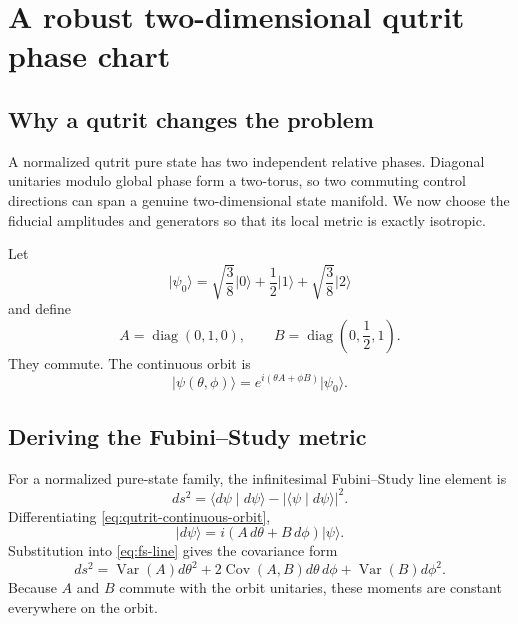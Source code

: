 \documentclass[11pt]{article}
\theoremstyle{definition}
\theoremstyle{remark}
\newcommand{\diag}{\operatorname{diag}}
\newcommand{\ket}[1]{\lvert #1\rangle}
\newcommand{\braket}[2]{\langle #1\mid #2\rangle}
\begin{document}
\section{A robust two-dimensional qutrit phase chart}
\label{sec:qutrit}

\subsection{Why a qutrit changes the problem}

A normalized qutrit pure state has two independent relative phases. Diagonal
unitaries modulo global phase form a two-torus, so two commuting control
directions can span a genuine two-dimensional state manifold. We now choose
the fiducial amplitudes and generators so that its local metric is exactly
isotropic.

Let
\begin{equation}
 \ket{\psi_0}
 =\sqrt{\frac38}\ket0+\frac12\ket1+\sqrt{\frac38}\ket2
 \label{eq:qutrit-fiducial}
\end{equation}
and define
\begin{equation}
 A=\diag(0,1,0),\qquad
 B=\diag\left(0,\frac12,1\right).
 \label{eq:qutrit-generators}
\end{equation}
They commute. The continuous orbit is
\begin{equation}
 \ket{\psi(\theta,\phi)}
 =e^{i(\theta A+\phi B)}\ket{\psi_0}.
 \label{eq:qutrit-continuous-orbit}
\end{equation}

\subsection{Deriving the Fubini--Study metric}

For a normalized pure-state family, the infinitesimal Fubini--Study line
element is
\begin{equation}
 ds^2=\braket{d\psi}{d\psi}
 -|\braket{\psi}{d\psi}|^2.
 \label{eq:fs-line}
\end{equation}
Differentiating \cref{eq:qutrit-continuous-orbit},
\begin{equation}
 \ket{d\psi}=i(A\,d\theta+B\,d\phi)\ket\psi.
\end{equation}
Substitution into \cref{eq:fs-line} gives the covariance form
\begin{equation}
 ds^2=
 \operatorname{Var}(A)d\theta^2+
 2\operatorname{Cov}(A,B)d\theta\,d\phi+
 \operatorname{Var}(B)d\phi^2.
 \label{eq:fs-covariance}
\end{equation}
Because $A$ and $B$ commute with the orbit unitaries, these moments are
constant everywhere on the orbit.
\end{document}
